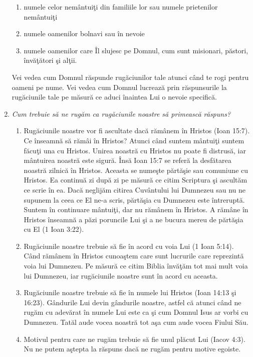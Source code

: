\begin{enumerate}
\begin{enumerate}
		\item numele celor nemântuiţi din familiile lor sau numele prietenilor nemântuiţi
		\item numele oamenilor bolnavi sau în nevoie
		\item numele oamenilor care Îl slujesc pe Domnul, cum sunt misionari, păstori, învăţători şi alţii.

	\end{enumerate}
	
	Vei vedea cum Domnul răspunde rugăciunilor tale atunci când te rogi pentru oameni pe nume. Vei vedea cum Domnul lucrează prin răspunsurile la rugăciunile tale pe măsură ce aduci înaintea Lui o nevoie specifică.
	
	\item \textit{Cum trebuie să ne rugăm ca rugăciunile noastre să primească răspuns?}
	
	\begin{enumerate}
	
		\item Rugăciunile noastre vor fi ascultate dacă rămânem în Hristos (Ioan 15:7). Ce înseamnă să rămâi în Hristos? Atunci când suntem mântuiţi suntem făcuţi una cu Hristos. Unirea noastră cu Hristos nu poate fi distrusă, iar mântuirea noastră este sigură. Însă Ioan 15:7 se referă la desfătarea noastră zilnică în Hristos. Aceasta se numeşte părtăşie sau comuniune cu Hristos. Ea continuă zi după zi pe măsură ce citim Scriptura şi ascultăm ce scrie în ea. Dacă neglijăm citirea Cuvântului lui Dumnezeu sau nu ne supunem la ceea ce El ne-a scris, părtăşia cu Dumnezeu este întreruptă. Suntem în continuare mântuiţi, dar nu rămânem în Hristos. A rămâne în Hristos înseamnă a păzi poruncile Lui şi a ne bucura mereu de părtăşia cu El (1 Ioan 3:22).
		
		\item Rugăciunile noastre trebuie să fie în acord cu voia Lui (1 Ioan 5:14). Când rămânem în Hristos cunoaştem care sunt lucrurile care reprezintă voia lui Dumnezeu. Pe măsură ce citim Biblia învăţăm tot mai mult voia lui Dumnezeu, iar rugăciunile noastre sunt în acord cu aceasta. 
		
		\item Rugăciunile noastre trebuie să fie în numele lui Hristos (Ioan 14:13 şi 16:23). Gândurile Lui devin gândurile noastre, astfel că atunci când ne rugăm cu adevărat în numele Lui este ca şi cum Domnul Isus ar vorbi cu Dumnezeu. Tatăl aude vocea noastră tot aşa cum aude vocea Fiului Său.
		
		\item Motivul pentru care ne rugăm trebuie să fie unul plăcut Lui (Iacov 4:3). Nu ne putem aştepta la răspuns dacă ne rugăm pentru motive egoiste.
		

\end{enumerate}
\end{enumerate}
